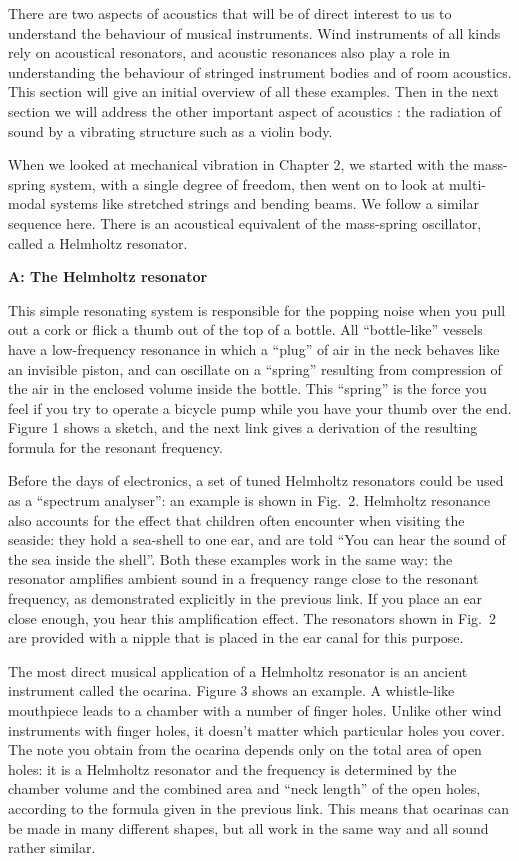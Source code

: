

  There are two aspects of acoustics that will be of direct interest to us to 
  understand the behaviour of musical instruments. Wind instruments of all 
  kinds rely on acoustical resonators, and acoustic resonances also play a role 
  in understanding the behaviour of stringed instrument bodies and of room 
  acoustics. This section will give an initial overview of all these examples. 
  Then in the next section we will address the other important aspect of 
  acoustics : the radiation of sound by a vibrating structure such as a violin 
  body. 

  When we looked at mechanical vibration in Chapter 2, we started with the 
  mass-spring system, with a single degree of freedom, then went on to look at 
  multi-modal systems like stretched strings and bending beams. We follow a 
  similar sequence here. There is an acoustical equivalent of the mass-spring 
  oscillator, called a Helmholtz resonator. 

  \textbf{A: The Helmholtz resonator} 

  This simple resonating system is responsible for the popping noise when you 
  pull out a cork or flick a thumb out of the top of a bottle. All 
  “bottle-like” vessels have a low-frequency resonance in which a “plug” of air 
  in the neck behaves like an invisible piston, and can oscillate on a “spring” 
  resulting from compression of the air in the enclosed volume inside the 
  bottle. This ``spring'' is the force you feel if you try to operate a bicycle 
  pump while you have your thumb over the end. Figure 1 shows a sketch, and the 
  next link gives a derivation of the resulting formula for the resonant 
  frequency. 

  Before the days of electronics, a set of tuned Helmholtz resonators could be 
  used as a “spectrum analyser”: an example is shown in Fig.\ 2. Helmholtz 
  resonance also accounts for the effect that children often encounter when 
  visiting the seaside: they hold a sea-shell to one ear, and are told ``You 
  can hear the sound of the sea inside the shell''. Both these examples work in 
  the same way: the resonator amplifies ambient sound in a frequency range 
  close to the resonant frequency, as demonstrated explicitly in the previous 
  link. If you place an ear close enough, you hear this amplification effect. 
  The resonators shown in Fig.\ 2 are provided with a nipple that is placed in 
  the ear canal for this purpose. 

  The most direct musical application of a Helmholtz resonator is an ancient 
  instrument called the ocarina. Figure 3 shows an example. A whistle-like 
  mouthpiece leads to a chamber with a number of finger holes. Unlike other 
  wind instruments with finger holes, it doesn't matter which particular holes 
  you cover. The note you obtain from the ocarina depends only on the total 
  area of open holes: it is a Helmholtz resonator and the frequency is 
  determined by the chamber volume and the combined area and ``neck length'' of 
  the open holes, according to the formula given in the previous link. This 
  means that ocarinas can be made in many different shapes, but all work in the 
  same way and all sound rather similar. 

